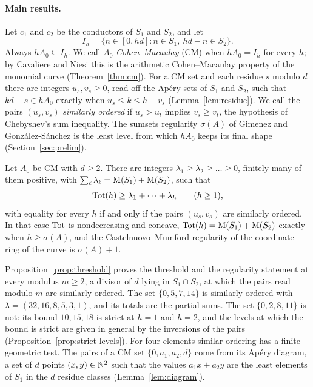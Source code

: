 \paragraph{Main results.} Let $c_1$ and $c_2$ be the conductors of $S_1$ and $S_2$, and let
\[
I_h=\{n\in[0,hd]:n\in S_1,\ hd-n\in S_2\}.
\]
Always $hA_0\subseteq I_h$. We call $A_0$ \emph{Cohen--Macaulay} (CM) when $hA_0=I_h$ for every $h$; by Cavaliere and Niesi this is the arithmetic Cohen--Macaulay property of the monomial curve (Theorem~\ref{thm:cm}). For a CM set and each residue $s$ modulo $d$ there are integers $u_s,v_s\ge0$, read off the Ap\'ery sets of $S_1$ and $S_2$, such that $kd-s\in hA_0$ exactly when $u_s\le k\le h-v_s$ (Lemma~\ref{lem:residue}). We call the pairs $(u_s,v_s)$ \emph{similarly ordered} if $u_s>u_t$ implies $v_s\ge v_t$, the hypothesis of Chebyshev's sum inequality. The sumsets regularity $\sigma(A)$ of Gimenez and Gonz\'alez-S\'anchez is the least level from which $hA_0$ keeps its final shape (Section~\ref{sec:prelim}).

\begin{maintheorem}\label{thm:A}
Let $A_0$ be CM with $d\ge2$. There are integers $\lambda_1\ge\lambda_2\ge\dots\ge0$, finitely many of them positive, with $\sum_\ell\lambda_\ell=\operatorname{M}(S_1)+\operatorname{M}(S_2)$, such that
\[
\operatorname{Tot}(h)\ge\lambda_1+\dots+\lambda_h\qquad(h\ge1),
\]
with equality for every $h$ if and only if the pairs $(u_s,v_s)$ are similarly ordered. In that case $\operatorname{Tot}$ is nondecreasing and concave, $\operatorname{Tot}(h)=\operatorname{M}(S_1)+\operatorname{M}(S_2)$ exactly when $h\ge\sigma(A)$, and the Castelnuovo--Mumford regularity of the coordinate ring of the curve is $\sigma(A)+1$.
\end{maintheorem}

Proposition~\ref{prop:threshold} proves the threshold and the regularity statement at every modulus $m\ge2$, a divisor of $d$ lying in $S_1\cap S_2$, at which the pairs read modulo $m$ are similarly ordered. The set $\{0,5,7,14\}$ is similarly ordered with $\lambda=(32,16,8,5,3,1)$, and its totals are the partial sums. The set $\{0,2,8,11\}$ is not: its bound $10,15,18$ is strict at $h=1$ and $h=2$, and the levels at which the bound is strict are given in general by the inversions of the pairs (Proposition~\ref{prop:strict-levels}). For four elements similar ordering has a finite geometric test. The pairs of a CM set $\{0,a_1,a_2,d\}$ come from its Ap\'ery diagram, a set of $d$ points $(x,y)\in\mathbb{N}^2$ such that the values $a_1x+a_2y$ are the least elements of $S_1$ in the $d$ residue classes (Lemma~\ref{lem:diagram}).

